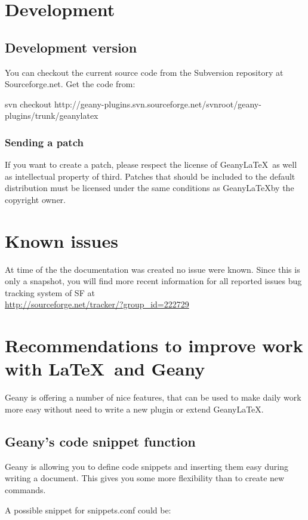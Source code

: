 \documentclass[%
a4paper,%
10pt,%
oneside,%
DIV18,
headsepline,
plainheadsepline,
footsepline,
plainfootsepline,
bibtotoc,%
liststotoc,%
BCOR12mm,%
halfparskip,%
openany,%
]{scrartcl}
\begin{document}
\section{Development}
\subsection{Development version}
You can checkout the current source code from the Subversion repository
at Sourceforge.net. Get the code from:

svn checkout
http://geany-plugins.svn.sourceforge.net/svnroot/geany-plugins/trunk/geanylatex

\subsubsection{Sending a patch}
If you want to create a patch, please respect the license of
Geany\LaTeX\ as well as intellectual property of third. Patches that
should be included to the default distribution must be licensed under
the same conditions as Geany\LaTeX by the copyright owner.

\section{Known issues}
At time of the the documentation was created no issue were known.
Since this is only a snapshot, you will find more recent information
for all reported issues bug tracking system of SF at \\
\url{http://sourceforge.net/tracker/?group\_id=222729}

\section{Recommendations to improve work with \LaTeX\ and Geany}
Geany is offering a number of nice features, that can be used to make
daily work more easy without need to write a new plugin or extend
Geany\LaTeX.

\subsection{Geany's code snippet function}
Geany is allowing you to define code snippets and inserting them easy
during writing a document. This gives you some more flexibility than to
create new commands.

A possible snippet for snippets.conf could be:
\end{document}
